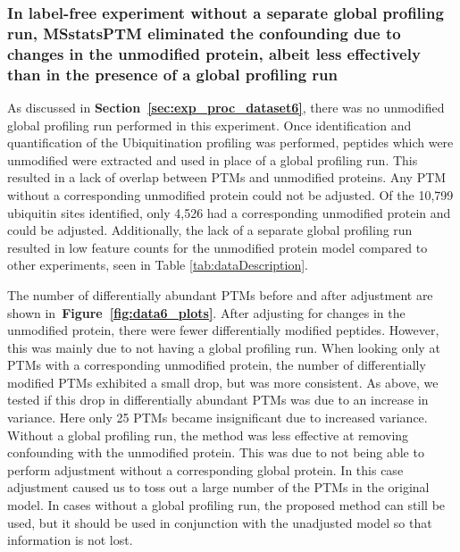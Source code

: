 \documentclass[mcp]{article}
\numberwithin{table}{section}
\def\figref#1{{\bf Figure~\ref{fig:#1}}}
\def\secref#1{{\bf Section~\ref{sec:#1}}}
\begin{document}

\subsubsection*{In label-free experiment without a separate global profiling run, MSstatsPTM eliminated the confounding due to changes in the unmodified protein, albeit less effectively than in the presence of a global profiling run}

As discussed in \secref{exp_proc_dataset6}, there was no unmodified global profiling run performed in this experiment. Once identification and quantification of the Ubiquitination profiling was performed, peptides which were unmodified were extracted and used in place of a global profiling run. This resulted in a lack of overlap between PTMs and unmodified proteins. Any PTM without a corresponding unmodified protein could not be adjusted. Of the 10,799 ubiquitin sites identified, only 4,526 had a corresponding unmodified protein and could be adjusted. Additionally, the lack of a separate global profiling run resulted in low feature counts for the unmodified protein model compared to other experiments, seen in Table \ref{tab:dataDescription}.

The number of differentially abundant PTMs before and after adjustment are shown in~\figref{data6_plots}. After adjusting for changes in the unmodified protein, there were fewer differentially modified peptides. However, this was mainly due to not having a global profiling run. When looking only at PTMs with a corresponding unmodified protein, the number of differentially modified PTMs exhibited a small drop, but was more consistent. As above, we tested if this drop in differentially abundant PTMs was due to an increase in variance. Here only 25 PTMs became insignificant due to increased variance. Without a global profiling run, the method was less effective at removing confounding with the unmodified protein. This was due to not being able to perform adjustment without a corresponding global protein. In this case adjustment caused us to toss out a large number of the PTMs in the original model. In cases without a global profiling run, the proposed method can still be used, but it should be used in conjunction with the unadjusted model so that information is not lost.
\end{document}
